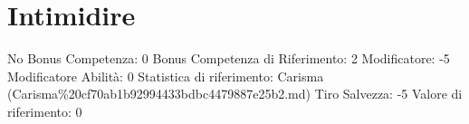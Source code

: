 \section{Intimidire}\label{intimidire}

\begin{description}
\tightlist
\item[Tags: ABI]
No Bonus Competenza: 0 Bonus Competenza di Riferimento: 2 Modificatore:
-5 Modificatore Abilità: 0 Statistica di riferimento: Carisma
(Carisma\%20cf70ab1b92994433bdbc4479887e25b2.md) Tiro Salvezza: -5
Valore di riferimento: 0
\end{description}
